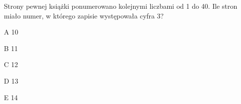 \begin{tresc}
Strony pewnej książki ponumerowano kolejnymi liczbami od 1 do 40. Ile stron miało numer, w którego zapisie występowała cyfra 3?
\end{tresc}
\begin{wariant}{A} 10 \end{wariant}
\begin{wariant}{B} 11 \end{wariant}
\begin{wariant}{C} 12 \end{wariant}
\begin{wariant}{D} 13 \end{wariant}
\begin{wariant}{E} 14 \end{wariant}
